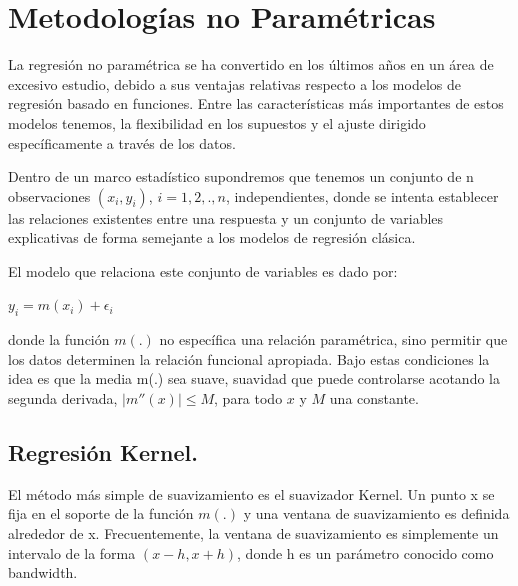\section{Metodolog\'ias no Param\'etricas}

\hspace*{0.4 cm} La regresi\'on no param\'etrica se ha convertido en los \'ultimos a\~nos en un
\'area de excesivo estudio, debido a sus ventajas relativas respecto a los
modelos de regresi\'on basado en funciones. Entre las caracter\'isticas m\'as
importantes de estos modelos tenemos, la flexibilidad en los supuestos y
el ajuste dirigido espec\'ificamente a trav\'es de los datos.


\hspace*{0.4 cm} Dentro de un marco estad\'istico supondremos que tenemos un conjunto
de n observaciones $(x_{i}, y_{i})$, $i= 1, 2,., n$, independientes, donde se intenta
establecer las relaciones existentes entre una respuesta y un conjunto de
variables explicativas de forma semejante a los modelos de regresi\'on
cl\'asica.


\hspace*{0.4 cm} El modelo que relaciona este conjunto de variables es dado por:

\begin{center}
$\displaystyle{y_{i} = m(x_{i}) + \epsilon_{i}}$
\end{center} 



\noindent donde la funci\'on $m(.)$ no espec\'ifica una relaci\'on param\'etrica, sino
permitir que los datos determinen la relaci\'on funcional apropiada. Bajo
estas condiciones la idea es que la media m(.) sea suave, suavidad que
puede controlarse acotando la segunda derivada, $|m''(x)| \leq M$, para todo
$x$ y $M$ una constante.

\subsection{Regresi\'on Kernel.\\}


\hspace*{0.4 cm} El m\'etodo m\'as simple de suavizamiento es el suavizador Kernel. Un
punto x se fija en el soporte de la funci\'on $m(.)$ y una ventana de
suavizamiento es definida alrededor de x. Frecuentemente, la ventana de
suavizamiento es simplemente un intervalo de la forma $(x - h, x + h)$,
donde h es un par\'ametro conocido como bandwidth.

